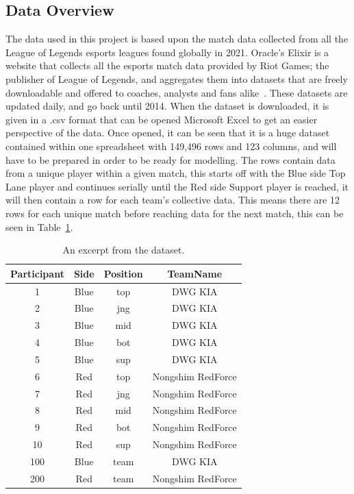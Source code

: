 \subsection{Data Overview}\label{subsec:Data Overview}
The data used in this project is based upon the match data collected from all the League of Legends esports leagues found globally in 2021.
Oracle's Elixir is a website that collects all the esports match data provided by Riot Games;
the publisher of League of Legends, and aggregates them into datasets that are freely downloadable and offered to coaches, analysts and fans alike~\citep{oraclesElixir}.
These datasets are updated daily, and go back until 2014.
When the dataset is downloaded, it is given in a .csv format that can be opened Microsoft Excel to get an easier perspective of the data.
Once opened, it can be seen that it is a huge dataset contained within one spreadsheet with 149,496 rows and 123 columns, and will have to be prepared in order to be ready for  modelling.
The rows contain data from a unique player within a given match, this starts off with the Blue side Top Lane player and continues serially until the Red side Support player is reached, it will then contain a row for each team's collective data.
This means there are 12 rows for each unique match before reaching data for the next match, this can be seen in Table~\ref{tab:1}.

\begin{table}[h!]
\centering
\caption{An excerpt from the dataset.}
\begin{tabular}{ c c c c }
 \hline
 Participant & Side & Position & TeamName \\ [0.5ex]
 \hline
 1 & Blue & top & DWG KIA \\
 2 & Blue & jng & DWG KIA \\
 3 & Blue & mid & DWG KIA \\
 4 & Blue & bot & DWG KIA \\
 5 & Blue & sup & DWG KIA \\
 6 & Red & top & Nongshim RedForce \\
 7 & Red & jng & Nongshim RedForce \\
 8 & Red & mid & Nongshim RedForce \\
 9 & Red & bot & Nongshim RedForce \\
 10 & Red & sup & Nongshim RedForce \\
 100 & Blue & team & DWG KIA \\
 200 & Red & team & Nongshim RedForce \\ [1ex]
 \hline
\end{tabular}
\label{tab:1}
\end{table}

